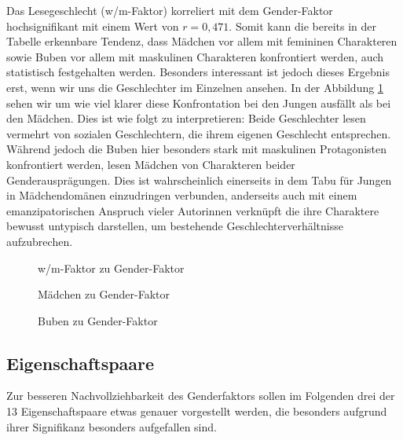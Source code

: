 

Das Lesegeschlecht (w/m-Faktor) korreliert mit dem Gender-Faktor
hochsignifikant mit einem Wert von $r = 0{,}471$. Somit kann die bereits
in der Tabelle erkennbare Tendenz, dass Mädchen vor allem mit femininen
Charakteren sowie Buben vor allem mit maskulinen Charakteren
konfrontiert werden, auch statistisch festgehalten werden. Besonders
interessant ist jedoch dieses Ergebnis erst, wenn wir uns die
Geschlechter im Einzelnen ansehen. In der Abbildung \ref{wm-gender}
sehen wir um wie viel klarer diese Konfrontation bei den Jungen ausfällt
als bei den Mädchen. Dies ist wie folgt zu interpretieren: Beide
Geschlechter lesen vermehrt von sozialen Geschlechtern, die ihrem
eigenen Geschlecht entsprechen. Während jedoch die Buben hier besonders
stark mit maskulinen Protagonisten konfrontiert werden, lesen Mädchen
von Charakteren beider Genderausprägungen. Dies ist wahrscheinlich
einerseits in dem Tabu für Jungen in Mädchendomänen einzudringen
verbunden, anderseits auch mit einem emanzipatorischen Anspruch vieler
Autorinnen verknüpft die ihre Charaktere bewusst untypisch darstellen,
um bestehende Geschlechterverhältnisse aufzubrechen.



\begin{figure}
\center
  \label{wm-gender}
  \small

  \caption[w/m-Faktor--Gender-Faktor]{w/m-Faktor zu Gender-Faktor}

\end{figure}

\begin{figure}
\center
  \label{w-gender}
  \small

  \caption[Mädchen--Gender-Faktor]{Mädchen zu Gender-Faktor}

\end{figure}

\begin{figure}
\center
  \label{m-gender}
  \small

  \caption[Buben--Gender-Faktor]{Buben zu Gender-Faktor}

\end{figure}

\subsection{Eigenschaftspaare}

Zur besseren Nachvollziehbarkeit des Genderfaktors sollen im Folgenden
drei der 13 Eigenschaftspaare etwas genauer vorgestellt werden, die
besonders aufgrund ihrer Signifikanz besonders aufgefallen sind.

